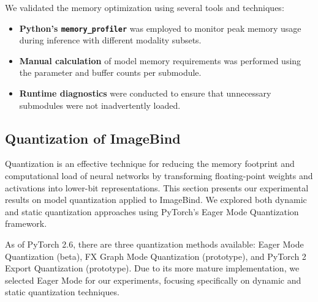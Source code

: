 \documentclass[runningheads]{IEEEtran}
\begin{document}

We validated the memory optimization using several tools and techniques:

\begin{itemize}
    \item \textbf{Python's \texttt{memory\_profiler}} was employed to monitor peak memory usage during inference with different modality subsets.
    \item \textbf{Manual calculation} of model memory requirements was performed using the parameter and buffer counts per submodule.
    \item \textbf{Runtime diagnostics} were conducted to ensure that unnecessary submodules were not inadvertently loaded.
\end{itemize}


\subsection{Quantization of ImageBind}

Quantization is an effective technique for reducing the memory footprint and computational load of neural networks by transforming floating-point weights and activations into lower-bit representations. This section presents our experimental results on model quantization applied to ImageBind. We explored both dynamic and static quantization approaches using PyTorch's Eager Mode Quantization framework.

As of PyTorch 2.6, there are three quantization methods available: Eager Mode Quantization (beta), FX Graph Mode Quantization (prototype), and PyTorch 2 Export Quantization (prototype). Due to its more mature implementation, we selected Eager Mode for our experiments, focusing specifically on dynamic and static quantization techniques.

\end{document}
